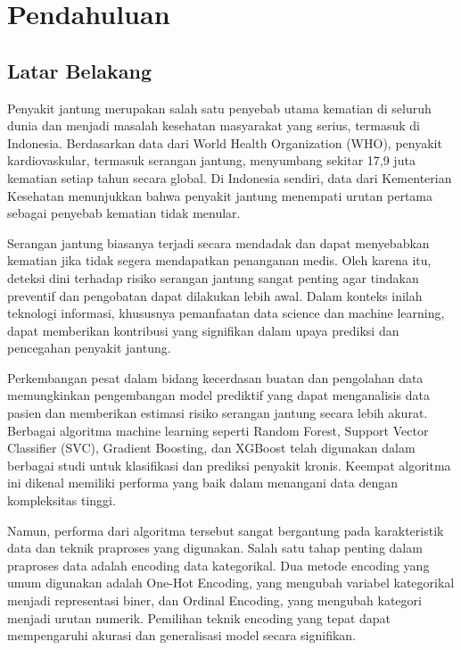\chapter{Pendahuluan}

\pagestyle{plain}
\section{Latar Belakang}

Penyakit jantung merupakan salah satu penyebab utama kematian di seluruh dunia dan menjadi masalah kesehatan masyarakat yang serius, termasuk di Indonesia. Berdasarkan data dari World Health Organization (WHO), penyakit kardiovaskular, termasuk serangan jantung, menyumbang sekitar 17,9 juta kematian setiap tahun secara global. Di Indonesia sendiri, data dari Kementerian Kesehatan menunjukkan bahwa penyakit jantung menempati urutan pertama sebagai penyebab kematian tidak menular.

Serangan jantung biasanya terjadi secara mendadak dan dapat menyebabkan kematian jika tidak segera mendapatkan penanganan medis. Oleh karena itu, deteksi dini terhadap risiko serangan jantung sangat penting agar tindakan preventif dan pengobatan dapat dilakukan lebih awal. Dalam konteks inilah teknologi informasi, khususnya pemanfaatan data science dan machine learning, dapat memberikan kontribusi yang signifikan dalam upaya prediksi dan pencegahan penyakit jantung.

Perkembangan pesat dalam bidang kecerdasan buatan dan pengolahan data memungkinkan pengembangan model prediktif yang dapat menganalisis data pasien dan memberikan estimasi risiko serangan jantung secara lebih akurat. Berbagai algoritma machine learning seperti Random Forest, Support Vector Classifier (SVC), Gradient Boosting, dan XGBoost telah digunakan dalam berbagai studi untuk klasifikasi dan prediksi penyakit kronis. Keempat algoritma ini dikenal memiliki performa yang baik dalam menangani data dengan kompleksitas tinggi.

Namun, performa dari algoritma tersebut sangat bergantung pada karakteristik data dan teknik praproses yang digunakan. Salah satu tahap penting dalam praproses data adalah encoding data kategorikal. Dua metode encoding yang umum digunakan adalah One-Hot Encoding, yang mengubah variabel kategorikal menjadi representasi biner, dan Ordinal Encoding, yang mengubah kategori menjadi urutan numerik. Pemilihan teknik encoding yang tepat dapat mempengaruhi akurasi dan generalisasi model secara signifikan.

